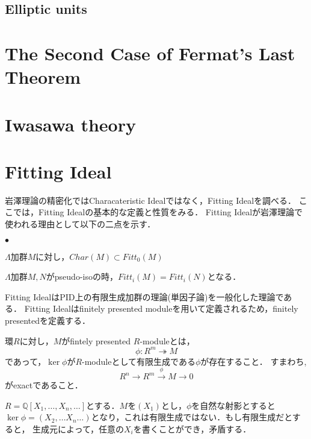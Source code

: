 \documentclass{ujarticle}
\renewenvironment{itemize}%
{%
   \begin{list}{\parbox{1zw}{$\bullet$}}%
   {%
      \setlength{\topsep}{0zh}
      \setlength{\itemindent}{0zw}
      \setlength{\leftmargin}{2zw}%
      \setlength{\rightmargin}{0zw}%
      \setlength{\labelsep}{1zw}%
      \setlength{\labelwidth}{3zw}%
      \setlength{\itemsep}{0em}%
      \setlength{\parsep}{0em}%
      \setlength{\listparindent}{0zw}%
   }
}{%
   \end{list}%
}
\begin{document}
\subsection{Elliptic units}
\label{sub:Elliptic units}

\section{The Second Case of Fermat's Last Theorem}
\label{sec:The Second Case of Fermat's Last Theorem}

\section{Iwasawa theory }
\label{sec:Iwasawa theory }



\section{Fitting Ideal}
\label{sec:FItting Ideal}
岩澤理論の精密化ではCharacateristic Idealではなく，Fitting Idealを調べる．
ここでは，Fitting Idealの基本的な定義と性質をみる．
Fitting Idealが岩澤理論で使われる理由として以下の二点を示す．
\begin{itemize}
  \item $\Lambda$加群$M$に対し，$Char(M) \subset Fitt_0(M)$
  \item $\Lambda$加群$M,N$がpseudo-isoの時，$Fitt_i(M)=Fitt_i(N)$となる．
\end{itemize}

Fitting IdealはPID上の有限生成加群の理論(単因子論)を一般化した理論である．
Fitting Idealはfinitely presented moduleを用いて定義されるため，finitely presentedを定義する．
\begin{dfn}
環$R$に対し，$M$がfintely presented $R$-moduleとは，
\begin{equation*}
 \phi: R^m \twoheadrightarrow M
\end{equation*}
であって，$\ker \phi$が$R$-moduleとして有限生成である$\phi$が存在すること．
すまわち,
\begin{equation*}
 R^n \to R^m \xrightarrow{\phi} M \to 0
\end{equation*}
がexactであること．
\end{dfn}

\begin{epl}
 $R=\mathbb{Q}[X_1 ,\dots,X_n,\dots]$とする．$M$を$(X_1)$とし，$\phi$を自然な射影とすると
  $\ker \phi=(X_2,\dots X_n \dots)$となり，これは有限生成ではない．もし有限生成だとすると，
  生成元によって，任意の$X_i$を書くことができ，矛盾する．
\end{epl}
\end{document}
